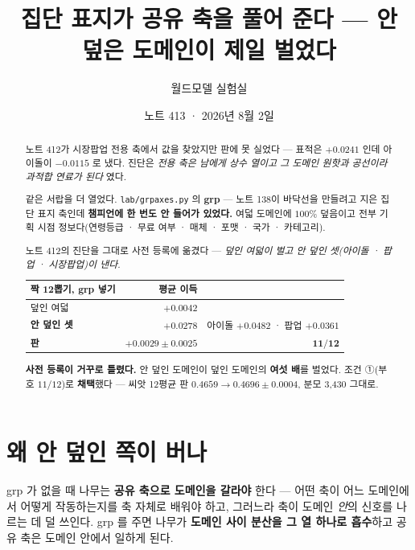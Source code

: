 \documentclass[11pt]{article}
\begin{document}
\title{집단 표지가 공유 축을 풀어 준다 --- 안 덮은 도메인이 제일 벌었다}
\author{월드모델 실험실}
\date{노트 413 · 2026년 8월 2일}
\maketitle

\begin{abstract}
노트 412가 시장팝업 전용 축에서 값을 찾았지만 판에 못 실었다 --- 표적은
$+0.0241$ 인데 아이돌이 $-0.0115$ 로 냈다. 진단은 \emph{전용 축은 남에게
상수 열이고 그 도메인 원핫과 공선이라 과적합 연료가 된다} 였다.

같은 서랍을 더 열었다. \texttt{lab/grpaxes.py} 의 \textbf{grp} --- 노트 138이
바닥선을 만들려고 지은 집단 표지 축인데 \textbf{챔피언에 한 번도 안 들어가
있었다.} 여덟 도메인에 $100\%$ 덮음이고 전부 기획 시점 정보다(연령등급 ·
무료 여부 · 매체 · 포맷 · 국가 · 카테고리).

노트 412의 진단을 그대로 사전 등록에 옮겼다 --- \emph{덮인 여덟이 벌고
안 덮인 셋(아이돌 · 팝업 · 시장팝업)이 낸다.}

\begin{center}
\begin{tabular}{lrr}
\hline
짝 12뽑기, grp 넣기 & 평균 이득 & \\
\hline
덮인 여덟 & $+0.0042$ & \\
\textbf{안 덮인 셋} & $\mathbf{+0.0278}$ & 아이돌 $+0.0482$ · 팝업 $+0.0361$ \\
\hline
\textbf{판} & $\mathbf{+0.0029 \pm 0.0025}$ & $\mathbf{11/12}$ \\
\hline
\end{tabular}
\end{center}

\textbf{사전 등록이 거꾸로 틀렸다.} 안 덮인 도메인이 덮인 도메인의
\textbf{여섯 배}를 벌었다. 조건 ①(부호 $11/12$)로 \textbf{채택}했다 ---
씨앗 12평균 판 $0.4659 \to \mathbf{0.4696 \pm 0.0004}$, 분모 3{,}430 그대로.
\end{abstract}

\section{왜 안 덮인 쪽이 버나}

grp 가 없을 때 나무는 \textbf{공유 축으로 도메인을 갈라야} 한다 --- 어떤
축이 어느 도메인에서 어떻게 작동하는지를 축 자체로 배워야 하고, 그러느라
축이 도메인 \emph{안}의 신호를 나르는 데 덜 쓰인다. grp 를 주면 나무가
\textbf{도메인 사이 분산을 그 열 하나로 흡수}하고 공유 축은 도메인 안에서
일하게 된다.
\end{document}

